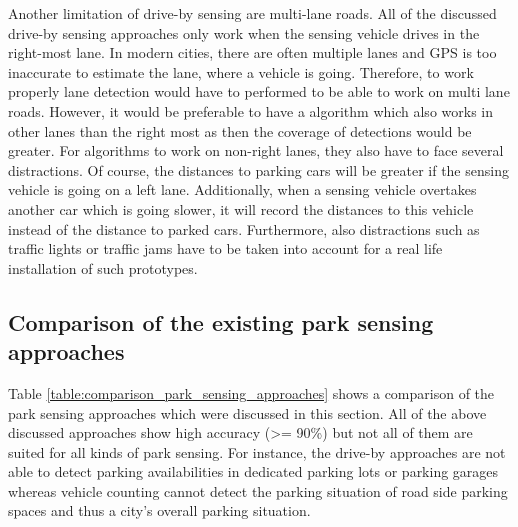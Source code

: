 Another limitation of drive-by sensing are multi-lane roads. All of the discussed drive-by sensing approaches only work when the sensing vehicle drives in the right-most lane. In modern cities, there are often multiple lanes and GPS is too inaccurate to estimate the lane, where a vehicle is going. Therefore, to work properly lane detection would have to performed to be able to work on multi lane roads. However, it would be preferable to have a algorithm which also works in other lanes than the right most as then the coverage of detections would be greater. For algorithms to work on non-right lanes, they also have to face several distractions. Of course, the distances to parking cars will be greater if the sensing vehicle is going on a left lane. Additionally, when a sensing vehicle overtakes another car which is going slower, it will record the distances to this vehicle instead of the distance to parked cars. Furthermore, also distractions such as traffic lights or traffic jams have to be taken into account for a real life installation of such prototypes.




\subsection{Comparison of the existing park sensing approaches}
\label{sec:comparison_park_sensing_approaches}

Table \ref{table:comparison_park_sensing_approaches} shows a comparison of the park sensing approaches which were discussed in this section. All of the above discussed approaches show high accuracy (>= 90\%) but not all of them are suited for all kinds of park sensing. For instance, the drive-by approaches are not able to detect parking availabilities in dedicated parking lots or parking garages whereas vehicle counting cannot detect the parking situation of road side parking spaces and thus a city's overall parking situation. 

